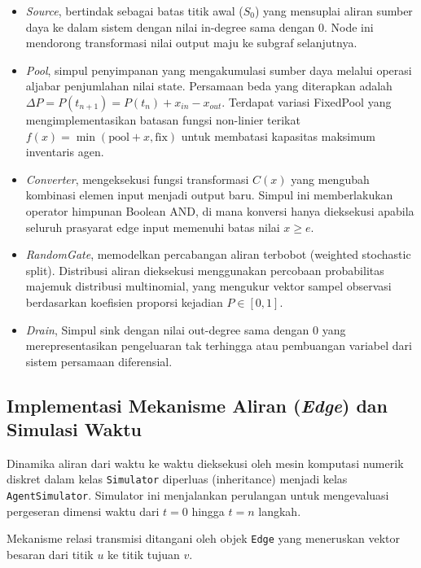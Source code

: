 \begin{itemize}
    \item \textit{Source},  bertindak sebagai batas titik awal ($S_0$) yang mensuplai aliran sumber daya ke dalam sistem dengan nilai in-degree sama dengan 0. Node ini mendorong transformasi nilai output maju ke subgraf selanjutnya.
    \item \textit{Pool}, simpul penyimpanan yang mengakumulasi sumber daya melalui operasi aljabar penjumlahan nilai state. Persamaan beda yang diterapkan adalah $\Delta P = P(t_{n+1}) = P(t_n) + x_{in} - x_{out}$. Terdapat variasi FixedPool yang mengimplementasikan batasan fungsi non-linier terikat $f(x) = \min(\text{pool} + x, \text{fix})$ untuk membatasi kapasitas maksimum inventaris agen.
    \item \textit{Converter}, mengeksekusi fungsi transformasi $C(x)$ yang mengubah kombinasi elemen input menjadi output baru. Simpul ini memberlakukan operator himpunan Boolean AND, di mana konversi hanya dieksekusi apabila seluruh prasyarat edge input memenuhi batas nilai $x \geq e$.
    \item \textit{RandomGate}, memodelkan percabangan aliran terbobot (weighted stochastic split). Distribusi aliran dieksekusi menggunakan percobaan probabilitas majemuk distribusi multinomial, yang mengukur vektor sampel observasi berdasarkan koefisien proporsi kejadian $P \in [0, 1]$.
    \item \textit{Drain}, Simpul sink dengan nilai out-degree sama dengan 0 yang merepresentasikan pengeluaran tak terhingga atau pembuangan variabel dari sistem persamaan diferensial.
\end{itemize}

\subsection{Implementasi Mekanisme Aliran (\textit{Edge}) dan Simulasi Waktu}
Dinamika aliran dari waktu ke waktu dieksekusi oleh mesin komputasi numerik diskret dalam kelas \texttt{Simulator} diperluas (inheritance) menjadi kelas \texttt{AgentSimulator}. Simulator ini menjalankan perulangan untuk mengevaluasi pergeseran dimensi waktu dari $t = 0$ hingga $t = n$ langkah.

Mekanisme relasi transmisi ditangani oleh objek \texttt{Edge} yang meneruskan vektor besaran dari titik $u$ ke titik tujuan $v$. 

